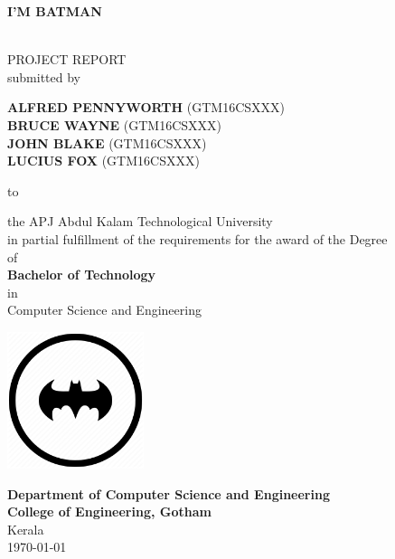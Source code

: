 \begin{titlepage}

\begin{center}


\begin{Large}{\textbf {I'M BATMAN}}\end{Large}\\[1.0cm]

 \textup{\large PROJECT REPORT}\\[1.0cm]

\textup{\large{submitted by}}

\vfill

\begin{large} 
    \textbf {ALFRED PENNYWORTH } (GTM16CSXXX) \\ 
    \textbf {BRUCE WAYNE } (GTM16CSXXX) \\ 
    \textbf {JOHN BLAKE } (GTM16CSXXX) \\ 
    \textbf {LUCIUS FOX } (GTM16CSXXX) \\ 

\end{large}

\vfill 

\textup{\large{to }}

\vfill


\textup{\normalsize {the APJ Abdul Kalam Technological University \\ in partial fulfillment of the requirements for the award of the Degree \\ of \\\textbf{ Bachelor of Technology} \\ in \\ \textit{}{Computer Science and Engineering}}}

\vfill

\includegraphics[width = 40mm]{Images/logo.png}

\vfill 


\textbf{Department of Computer Science and Engineering
}\\
\normalsize
\textbf{College of Engineering, Gotham}\\
Kerala\\

\today

\vspace{0.5cm}

\end{center}

\end{titlepage}
\vspace{1.5in}
\linespread{}